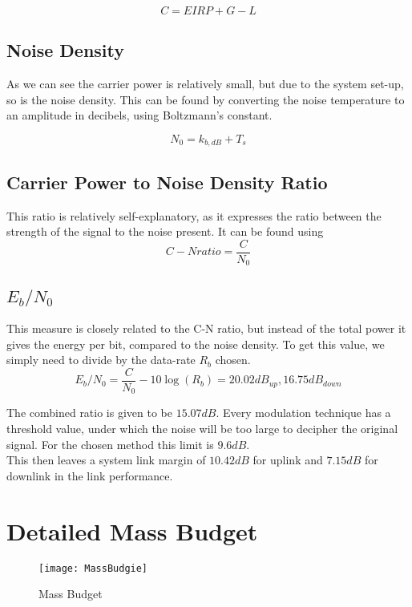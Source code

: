 \begin{equation}
C=EIRP+G-L
\end{equation}

\subsection{Noise Density}
As we can see the carrier power is relatively small, but due to the system set-up, so is the noise density. This can be found by converting the noise temperature to an amplitude in decibels, using Boltzmann's constant.

\begin{equation}
N_0=k_{b, dB}+T_{s}
\end{equation}

\subsection{Carrier Power to Noise Density Ratio}
This ratio is relatively self-explanatory, as it expresses the ratio between the strength of the signal to the noise present. It can be found using
\begin{equation}
C-N ratio=\dfrac{C}{N_{0}}
\end{equation}


\subsection{$E_{b}/N_{0}$}
This measure is closely related to the C-N ratio, but instead of the total power it gives the energy per bit, compared to the noise density. To get this value, we simply need to divide by the data-rate $R_b$ chosen.
\begin{equation}
E_{b}/N_{0}=\frac{C}{N_{0}}-10\log(R_b)=20.02dB_{up}, 16.75dB_{down}
\end{equation}

The combined ratio is given to be $15.07dB$. Every modulation technique has a threshold value, under which the noise will be too large to decipher the original signal. For the chosen method this limit is $9.6dB$.\\

This then leaves a system link margin of $10.42dB$ for uplink and $7.15dB$ for downlink in the link performance.

\section{Detailed Mass Budget}

\begin{landscape}
	\clearpage\pagestyle{empty} 
	\begin{figure}[H]
		\centering
		\texttt{[image: MassBudgie]}
		\caption{Mass Budget}
		\label{MassBudgie}
	\end{figure}
\end{landscape}
